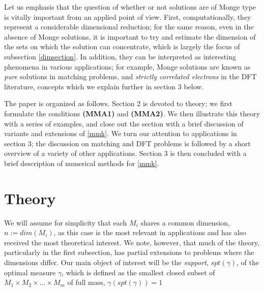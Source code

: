 \documentclass[letter,10pt]{article}
\theoremstyle{dotless}
\begin{document}
Let us emphasis that the question of whether or not solutions are of Monge type is vitally important from an applied point of view.  First, computationally, they represent a considerable dimensional reduction; for the same reason, even in the absence of Monge solutions, it is important to try and estimate the dimension of the sets on which the solution can concentrate, which is largely the focus of subsection \ref{dimsection}.  In addition, they can be interpreted as interesting phenomena in various applications; for example, Monge solutions are known as \textit{pure} solutions in matching problems, and \textit{strictly correlated electrons} in the DFT literature, concepts which we explain further in section 3  below.


The paper is organized as follows.  Section 2 is devoted to theory; we first formulate the conditions \textbf{(MMA1)} and \textbf{(MMA2)}.  We then illustrate this theory with a series of examples, and close out the section with a brief discussion of variants and extensions of \eqref{mmk}. We turn our attention to applications in section 3; the discussion on matching and DFT problems is followed by a short overview of a variety of other applications.  Section 3 is then concluded with a brief description of numerical methods for \eqref{mmk}.

\section{Theory}
We will assume for simplicity that each $M_i$ shares a common dimension, $n:=dim(M_i)$, as this case is the most relevant in applications and has also received the most theoretical interest.   We note, however, that much of the theory, particularly in the first subsection, has partial extensions to problems where the dimensions differ.  Our main object of interest will be the \textit{support}, $spt(\gamma)$, of the optimal measure $\gamma$, which is defined as the smallest closed subset of $M_1 \times M_2 \times...\times M_m$ of full mass, $\gamma(spt(\gamma)) =1$
\end{document}

